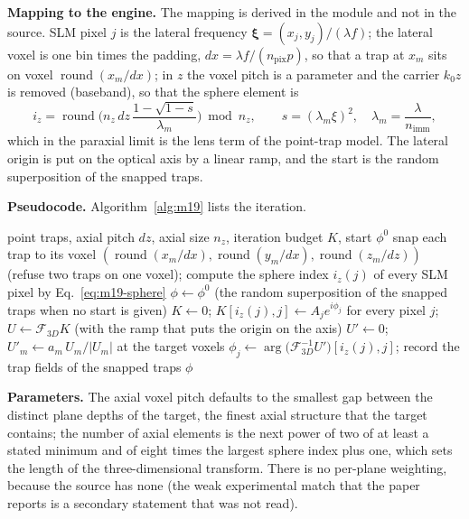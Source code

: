 \textbf{Mapping to the engine.} The mapping is derived in the module and not in the source. SLM pixel $j$ is the lateral frequency $\boldsymbol\xi=(x_j,y_j)/(\lambda f)$; the lateral voxel is one bin times the padding, $dx=\lambda f/(n_{\mathrm{pix}}p)$, so that a trap at $x_m$ sits on voxel $\operatorname{round}(x_m/dx)$; in $z$ the voxel pitch is a parameter and the carrier $k_0z$ is removed (baseband), so that the sphere element is
\begin{equation}
i_z=\operatorname{round}\Big(n_z\,dz\,\frac{1-\sqrt{1-s}}{\lambda_m}\Big)\bmod n_z,\qquad s=(\lambda_m\xi)^2,\quad\lambda_m=\frac{\lambda}{n_{\mathrm{imm}}},
\label{eq:m19-sphere}
\end{equation}
which in the paraxial limit is the lens term of the point-trap model. The lateral origin is put on the optical axis by a linear ramp, and the start is the random superposition of the snapped traps.

\textbf{Pseudocode.} Algorithm~\ref{alg:m19} lists the iteration.

\begin{algorithm}[t]
\caption{Volumetric Gerchberg--Saxton with the Ewald-sphere constraint on the grid of the engine.}
\label{alg:m19}
\begin{algorithmic}[1]
\Require point traps, axial pitch $dz$, axial size $n_z$, iteration budget $K$, start $\phi^0$
\State snap each trap to its voxel $(\operatorname{round}(x_m/dx),\operatorname{round}(y_m/dx),\operatorname{round}(z_m/dz))$ (refuse two traps on one voxel); compute the sphere index $i_z(j)$ of every SLM pixel by Eq.~\eqref{eq:m19-sphere}
\State $\phi\gets\phi^0$ (the random superposition of the snapped traps when no start is given)
  \State $K\gets0$; $K[i_z(j),j]\gets A_je^{i\phi_j}$ for every pixel $j$; $U\gets\mathcal F_{3D}K$ (with the ramp that puts the origin on the axis)
  \State $U'\gets0$; $U'_m\gets a_m\,U_m/|U_m|$ at the target voxels
  \State $\phi_j\gets\arg\big(\mathcal F_{3D}^{-1}U'\big)[i_z(j),j]$; record the trap fields of the snapped traps
\EndFor
\State \Return $\phi$
\end{algorithmic}
\end{algorithm}

\textbf{Parameters.} The axial voxel pitch defaults to the smallest gap between the distinct plane depths of the target, the finest axial structure that the target contains; the number of axial elements is the next power of two of at least a stated minimum and of eight times the largest sphere index plus one, which sets the length of the three-dimensional transform. There is no per-plane weighting, because the source has none (the weak experimental match that the paper reports is a secondary statement that was not read).

